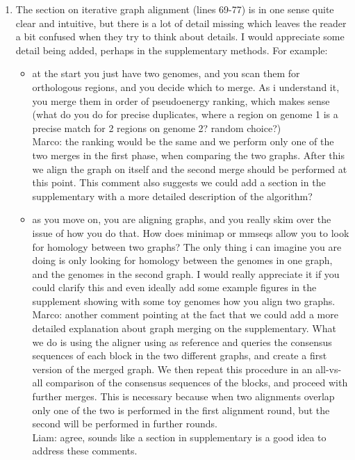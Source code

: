 \documentclass[aps,rmp,onecolumn]{revtex4-1}
\newcommand{\Marco}[1]{{\color{gray}Marco: #1}}
\newcommand{\Liam}[1]{{\color{teal}Liam: #1}}
\begin{document}
\begin{enumerate}
      \item The section on iterative graph alignment (lines 69-77) is in one sense quite clear and intuitive, but there is a lot of detail missing which leaves the reader a bit confused when they try to think about details. I would appreciate some detail being added, perhaps in the supplementary methods. For example:
            \begin{itemize}
                  \item at the start you just have two genomes, and you scan them for orthologous regions, and you decide which to merge. As i understand it, you merge them in order of pseudoenergy ranking, which makes sense (what do you do for precise duplicates, where a region on genome 1 is a precise match for 2 regions on genome 2? random choice?)\\
                        \Marco{the ranking would be the same and we perform only one of the two merges in the first phase, when comparing the two graphs. After this we align the graph on itself and the second merge should be performed at this point. This comment also suggests we could add a section in the supplementary with a more detailed description of the algorithm?}
                  \item as you move on, you are aligning graphs, and you really skim over the issue of how you do that. How does minimap or mmseqs allow you to look for homology between two graphs? The only thing i can imagine you are doing is only looking for homology between the genomes in one graph, and the genomes in the second graph. I would really appreciate it if you could clarify this and even ideally add some example figures in the supplement showing with some toy genomes how you align two graphs.\\
                        \Marco{another comment pointing at the fact that we could add a more detailed explanation about graph merging on the supplementary. What we do is using the aligner using as reference and queries the consensus sequences of each block in the two different graphs, and create a first version of the merged graph. We then repeat this procedure in an all-vs-all comparison of the consensus sequences of the blocks, and proceed with further merges. This is necessary because when two alignments overlap only one of the two is performed in the first alignment round, but the second will be performed in further rounds.}\\
                        \Liam{agree, sounds like a section in supplementary is a good idea to address these comments.}
            \end{itemize}


\end{enumerate}
\end{document}
